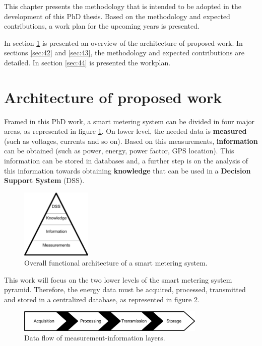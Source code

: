 
This chapter presents the methodology that is intended to be adopted in the development of this PhD thesis. Based on the methodology and expected contributions, a work plan for the upcoming years is presented.

In section \ref{sec:41} is presented an overview of the architecture of proposed work. In sections \ref{sec:42} and \ref{sec:43}, the methodology and expected contributions are detailed.
In section \ref{sec:44} is presented the workplan.

\section{Architecture of proposed work}
\label{sec:41}


Framed in this PhD work, a smart metering system can be divided in four major areas, as represented in figure \ref{fig:41topLevel}. On lower level, the needed data is \textbf{measured} (such as voltages, currents and so on).
Based on this measurements, \textbf{information} can be obtained (such as power, energy, power factor, GPS location).
This information can be stored in databases and, a further step is on the analysis of this information towards obtaining \textbf{knowledge} that can be used in a \textbf{Decision Support System} (DSS).

\begin{figure}[h!]
	\centering
	\vspace{-1em}
	\includegraphics[width=0.3\textwidth,keepaspectratio]{figures/40.Method/pyramid}
	\caption{Overall functional architecture of a smart metering system.}
	\label{fig:41topLevel}
\end{figure}

This work will focus on the two lower levels of the smart metering system pyramid. 
Therefore, the energy data must be acquired, processed, transmitted and stored in a centralized database, as represented in figure \ref{fig:41dataFlow}.

\begin{figure}[h!]
	\centering
	\includegraphics[width=0.8\textwidth,keepaspectratio]{figures/40.Method/data_flow}
	\caption{Data flow of measurement-information layers.}
	\label{fig:41dataFlow}
\end{figure}


